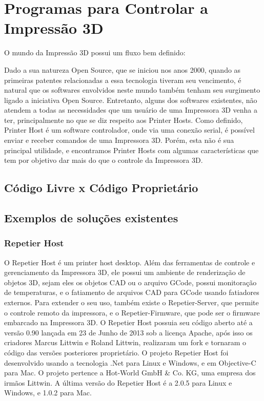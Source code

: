 \section{Programas para Controlar a Impressão 3D}
O mundo da Impressão 3D possui um fluxo bem definido:



Dado a sua natureza Open Source, que se iniciou nos anos 2000, quando as primeiras
patentes relacionadas a essa tecnologia tiveram seu vencimento, é natural que os
softwares envolvidos neste mundo também tenham seu surgimento ligado a iniciativa Open Source.
Entretanto, alguns dos softwares existentes, não atendem a todas as necessidades
que um usuário de uma Impressora 3D venha a ter, principalmente no que se diz respeito aos Printer Hosts.
Como definido, Printer Host é um software controlador, onde via uma conexão serial,
é possível enviar e receber comandos de uma Impressora 3D. Porém, esta não é sua
principal utilidade, e encontramos Printer Hosts com algumas características que
tem por objetivo dar mais do que o controle da Impressora 3D.

\subsection{Código Livre x Código Proprietário}

\subsection{Exemplos de soluções existentes}

\subsubsection{Repetier Host}
O Repetier Host é um printer host desktop. Além das
ferramentas de controle e gerenciamento da Impressora 3D, ele
possui um ambiente de renderização de objetos 3D, sejam eles
os objetos CAD ou o arquivo GCode, possui monitoração de
temperaturas, e o fatiamento de arquivos CAD para GCode
usando fatiadores externos. Para extender o seu uso, também
existe o Repetier-Server, que permite o controle remoto da
impressora, e o Repetier-Firmware, que pode ser o firmware
embarcado na Impressora 3D. O Repetier Host possuia seu
código aberto até a versão 0.90 lançada em 23 de Junho de
2013 sob a licença Apache, após isso os criadores Marcus
Littwin e Roland Littwin, realizaram um fork e tornaram o
código das versões posteriores proprietário. O projeto
Repetier Host foi desenvolvido usando a tecnologia .Net para Linux e Windows, e
em Objective-C para Mac. O projeto pertence a Hot-World GmbH \& Co. KG, uma empresa dos
irmãos Littwin. A última versão do Repetier Host é a 2.0.5
para Linux e Windows, e 1.0.2 para Mac.
\iffalse
Referências:
- 0.90 codigo: https://github.com/repetier/Repetier-Host
- Licença: https://github.com/repetier/Repetier-Host/blob/master/APACHE-LICENSE-2.0.txt
- Author: https://www.repetier.com/about-us/
- Versão: https://www.repetier.com/download-now/
\fi

